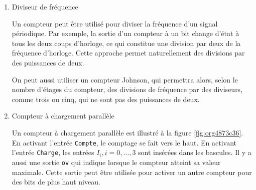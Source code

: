 \documentclass[letter, oneside]{book}
\begin{document}
\begin{enumerate}
On peut construire des signaux de synchronisation distincts en
combinant deux par deux au moyen d'une porte ET des signaux de sortie
voisins (dans le cycle) ou leurs compléments. Le tableau \ref{tab:orgc7363d4}
donne les paires de sorties à combiner pour ce faire avec le compteur
Johnson de quatre bits.

Nous avons appliqué ce principe à un compteur Johnson de deux bits,
présenté sur la figure \ref{fig:org30793a3}. La figure montre une trace
d'exécution avec les signaux de sortie. On y voit que chacun des
quatre signaux est activé à son tour.

\begin{figure}[htbp]
\centering

\caption{\label{fig:org30793a3}Compteur Johnson à 2 bits et circuit de décodage pour signaux de synchronisation}
\end{figure}

Si on s'intéresse aux sorties des bascules de ce même compteur
Johnson, on peut voir sur la trace d'exécution de la figure
\ref{fig:orgd35fa0a} qu'on obtient des signaux en \textbf{quadrature},
c'est-à-dire que les sorties sont déphasées de 90 degrés les unes par
rapport aux autres, comme le sont des fonctions \(\sin(), \cos(),
-\sin(), -\cos()\).

\begin{figure}[htbp]
\centering

\caption{\label{fig:orgd35fa0a}Signaux en quadrature obtenus au moyen d'un compteur Johnson à 2 bits}
\end{figure} 

\item Diviseur de fréquence
\label{sec:org250fa46}

Un compteur peut être utilisé pour diviser la fréquence d'un signal
périodique. Par exemple, la sortie d'un compteur à un bit change
d'état à tous les deux coups d'horloge, ce qui constitue une division
par deux de la fréquence d'horloge. Cette approche permet
naturellement des divisions par des puissances de deux.

On peut aussi utiliser un compteur Johnson, qui permettra alors, selon
le nombre d'étages du compteur, des divisions de fréquence par des
diviseurs, comme trois ou cinq, qui ne sont pas des puissances de deux.

\item Compteur à chargement parallèle
\label{sec:org82af226}

Un compteur à chargement parallèle est illustré à la figure
\ref{fig:org4873c36}. En activant l'entrée \texttt{Compte}, le comptage
se fait vers le haut. En activant l'entrée \texttt{Charge}, les entrées \(I_i, i=0, \ldots, 3\) sont insérées dans les bascules. Il y a aussi une
sortie \texttt{ov} qui indique lorsque le compteur atteint sa valeur
maximale. Cette sortie peut être utilisée pour activer un autre
compteur pour des bits de plus haut niveau.


\end{enumerate}
\end{document}
